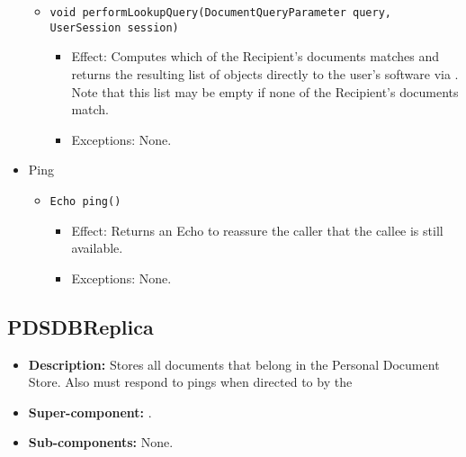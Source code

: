 \begin{itemize}
\begin{itemize}
		\item \texttt{void performLookupQuery(DocumentQueryParameter query, UserSession session)}
		\begin{itemize}
			\item Effect: Computes which of the Recipient's documents matches  and returns the resulting list of  objects directly to the user's software via . Note that this list may be empty if none of the Recipient's documents match.
			\item Exceptions: None.
		\end{itemize}
	\end{itemize}

	\item Ping
	\begin{itemize}
		\item \texttt{Echo ping()}
		\begin{itemize}
			\item Effect: Returns an Echo to reassure the caller that the callee is still available.
			\item Exceptions: None.
		\end{itemize}
	\end{itemize}
\end{itemize}

\subsection{PDSDBReplica} 
\begin{itemize}
    \item \textbf{Description:} Stores all documents that belong in the Personal Document Store. Also must respond to pings when directed to by the 
    \item \textbf{Super-component:} .
    \item \textbf{Sub-components:} None.
\end{itemize}

